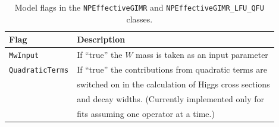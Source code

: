 \documentclass[preprint,3p,12pt]{elsarticle}
\begin{document}
\begin{table}[tb]
 \centering
\caption{Model flags in the {\tt NPEffectiveGIMR} and {\tt NPEffectiveGIMR\_LFU\_QFU} classes.}\vspace{0.2cm}
  \begin{tabular}{|l|l|}
    \hline
      \textbf{Flag} & \textbf{Description} \\
    \hline
      {\tt MwInput} & If ``true'' the $W$ mass is taken as an input parameter \\
    \hline
      {\tt QuadraticTerms} &  If ``true'' the contributions from quadratic terms are\\
      &  switched on in the calculation of Higgs cross sections\\
      &  and decay widths. (Currently implemented only for \\
      &  fits assuming one operator at a time.)\\
    \hline
  \end{tabular}
  \label{tab:GIMRflags}
\end{table} 
\end{document}
